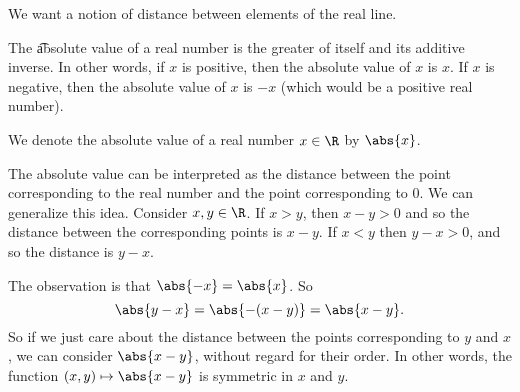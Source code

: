 

We want a notion of distance between elements of the real line.


The \t{absolute value} of a real number is the greater of itself and its additive inverse.
In other words, if $x$ is positive, then the absolute value of $x$ is $x$.
If $x$ is negative, then the absolute value of $x$ is $-x$ (which would be a positive real number).


We denote the absolute value of a real number $x \in \R$ by $\abs{x}$.


The absolute value can be interpreted as the distance between the point corresponding to the real number and the point corresponding to 0.
We can generalize this idea.
Consider  $x, y \in \R$.
If $x > y$, then $x - y > 0$ and so the distance between the corresponding points is $x - y$.
If $x < y$ then $y - x > 0$, and so the distance is $y - x$.

The observation is that $\abs{-x} = \abs{x}$.
So
\[
  \abs{y - x} = \abs{-(x - y)} = \abs{x-y}.
\]
So if we just care about the distance between the points corresponding to $y$ and $x$, we can consider $\abs{x - y}$, without regard for their order.
In other words, the function $(x, y) \mapsto \abs{x - y}$ is symmetric in $x$ and $y$.
\blankpage
